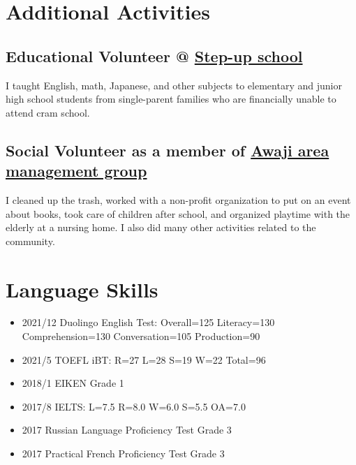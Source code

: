 \documentclass[12pt]{article}
\begin{document}
\section*{Additional Activities}
  \subsection*{Educational Volunteer @ \href{https://stepup-unesco.com/}{Step-up school}}
    I taught English, math, Japanese, and other subjects to elementary and junior high school students from single-parent families who are financially unable to attend cram school.
  \subsection*{Social Volunteer as a member of \href{https://www.waterras.com/awaji_am.html}{Awaji area management group}}
    I cleaned up the trash, worked with a non-profit organization to put on an event about books, took care of children after school, and organized playtime with the elderly at a nursing home.
    I also did many other activities related to the community.

\section*{Language Skills}
  \begin{itemize}
    \item 2021/12 Duolingo English Test: Overall=125 Literacy=130 Comprehension=130 Conversation=105 Production=90
    \item 2021/5 TOEFL iBT: R=27 L=28 S=19 W=22 Total=96
    \item 2018/1 EIKEN Grade 1
    \item 2017/8 IELTS: L=7.5 R=8.0 W=6.0 S=5.5 OA=7.0
    \item 2017 Russian Language Proficiency Test Grade 3
    \item 2017 Practical French Proficiency Test Grade 3
  \end{itemize}
\end{document}
